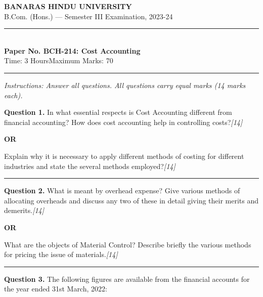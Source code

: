 \documentclass[11pt,a4paper]{article}
\newcommand{\pts}[1]{\hfill   \textit{[#1]}}
\begin{document}
\begin{center}
  {\large\bfseries BANARAS HINDU UNIVERSITY}\\[2pt]
  {\normalsize B.Com. (Hons.) --- Semester III Examination, 2023-24}\\[6pt]
  \rule{0.8\linewidth}{0.5pt}\\[6pt]
  {\large\bfseries Paper No. BCH-214: Cost Accounting}\\[4pt]
  {\normalsize Time: 3 Hours\hfill Maximum Marks: 70}
\end{center}

\rule{\linewidth}{0.4pt}

\smallskip



\noindent   \textit{Instructions: Answer all questions. All questions carry equal marks (14 marks each).}

\bigskip




\noindent   \textbf{Question 1.}
In what essential respects is Cost Accounting different from financial accounting? How does cost accounting help in controlling costs?\pts{14}

\centerline{   \textbf{OR}}

Explain why it is necessary to apply different methods of costing for different industries and state the several methods employed?\pts{14}

\medskip\rule{\linewidth}{0.2pt}




\noindent   \textbf{Question 2.}
What is meant by overhead expense? Give various methods of allocating overheads and discuss any two of these in detail giving their merits and demerits.\pts{14}

\centerline{   \textbf{OR}}

What are the objects of Material Control? Describe briefly the various methods for pricing the issue of materials.\pts{14}

\medskip\rule{\linewidth}{0.2pt}




\noindent   \textbf{Question 3.}
The following figures are available from the financial accounts for the year ended 31st March, 2022:
\end{document}
